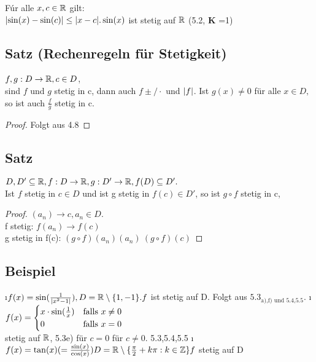 \begin{enumerate}[a)]
\begin{figure}[h!]
\end{figure}
Fúr alle $x,c \in \mathbb{R}$ gilt:\\
$\lvert \sin(x) - \sin(c) \rvert \leq \lvert x-c \rvert.\\
\sin(x)$ ist stetig auf $\mathbb{R}$ (5.2, $\mathbf{K}$ =1)
\end{enumerate}
\subsection{Satz (Rechenregeln für Stetigkeit)}
$f,g : D \rightarrow \mathbb{R}, c \in D$,\\
sind $f$ und $g$ stetig in c, dann auch $f \pm/\cdot$ und $\lvert f \rvert$. Ist $g(x) \neq 0$ für alle $x \in D,$ so ist auch $\frac{f}{g}$ stetig in c.
\begin{proof}
Folgt aus 4.8
\end{proof}
\subsection[Satz: Hintereinanderausführung von stetigen Funktionen]{Satz}
$D,D' \subseteq \mathbb{R} , f : D \rightarrow \mathbb{R},\\
g: D' \rightarrow \mathbb{R} , f(D) \subseteq D'.$\\
Ist $f$ stetig in $c \in D$ und ist g stetig in $f(c) \in D'$, so ist $g \circ f$ stetig in c,
\begin{proof}
$(a_n) \rightarrow c, a_n \in D$.\\
f stetig: $f(a_n) \rightarrow f(c)$\\
g stetig in f(c): $(g \circ f)(a_n)(a_n)\ (g \circ f)(c)$
\end{proof}
\subsection{Beispiel}
\begin{enumerate}[a)]
\i $f(x) = \sin(\frac{1}{\lvert x^2-1 \rvert}), D = \mathbb{R} \setminus \{1,-1 \}.
f$ ist stetig auf D.
Folgt aus $5.3_{\text{a),f) und 5.4,5.5}}$.
\i $f(x) = \begin{cases}
x \cdot \sin(\frac{1}{x}) &\text{falls } x \neq 0\\
0 &\text{falls } x = 0 
\end{cases}$\\
stetig auf $\mathbb{R}$,
5.3e) für $c = 0$ für $c \neq 0$. 5.3,5.4,5.5
\i $f(x) = \tan(x) (= \frac{\sin(x)}{\cos(x)})\\
D = \mathbb{R} \setminus \{\frac{\pi}{2}+ k\pi: k \in \mathbb{Z} \}
f$ stetig auf D
\end{enumerate}
